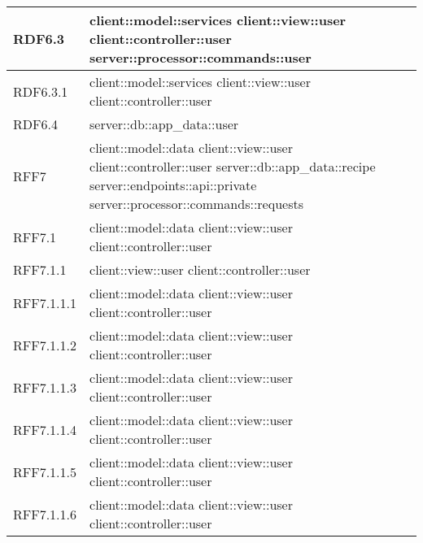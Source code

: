 \begin{center}
\begin{longtable}{| p{4cm} | p{8cm} |}
RDF6.3 & client::model::services \newline client::view::user \newline client::controller::user \newline server::processor::commands::user \\
\hline
RDF6.3.1 & client::model::services \newline client::view::user \newline client::controller::user \\
\hline
RDF6.4 & server::db::app\_data::user \\
\hline
RFF7 & client::model::data \newline client::view::user \newline client::controller::user \newline server::db::app\_data::recipe \newline server::endpoints::api::private \newline server::processor::commands::requests \\
\hline
RFF7.1 & client::model::data \newline client::view::user \newline client::controller::user \\
\hline
RFF7.1.1 & client::view::user \newline client::controller::user \\
\hline
RFF7.1.1.1 & client::model::data \newline client::view::user \newline client::controller::user \\
\hline
RFF7.1.1.2 & client::model::data \newline client::view::user \newline client::controller::user \\
\hline
RFF7.1.1.3 & client::model::data \newline client::view::user \newline client::controller::user \\
\hline
RFF7.1.1.4 & client::model::data \newline client::view::user \newline client::controller::user \\
\hline
RFF7.1.1.5 & client::model::data \newline client::view::user \newline client::controller::user \\
\hline
RFF7.1.1.6 & client::model::data \newline client::view::user \newline client::controller::user \\

\end{longtable}
\end{center}
